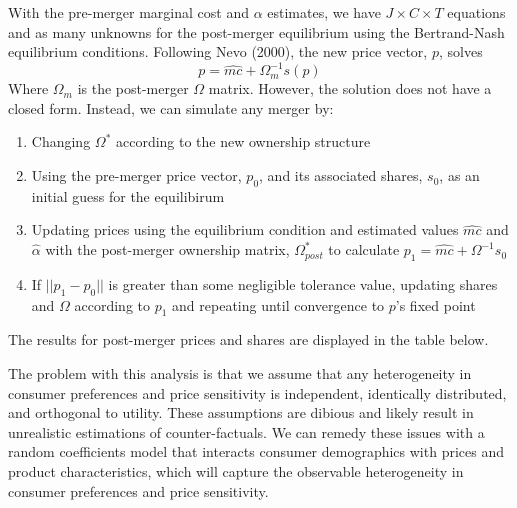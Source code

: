 \documentclass{article}
\newcommand{\ahat}{\hat{\alpha}}
\begin{document}
With the pre-merger marginal cost and $\alpha$ estimates, we have $J\times C\times T$ equations and as many unknowns for the post-merger equilibrium using the Bertrand-Nash equilibrium conditions. Following Nevo (2000), the new price vector, $p$, solves \[ 
        p = \hat{mc} + \Omega_{m}^{-1}s(p)
\]
Where $\Omega_m$ is the post-merger $\Omega$ matrix. 
However, the solution does not have a closed form. Instead, we can simulate any merger by:
\begin{enumerate}
        \item Changing $\Omega^*$ according to the new ownership structure
        \item Using the pre-merger price vector, $p_0$, and its associated shares, $s_0$, as an initial guess for the equilibirum
        \item Updating prices using the equilibrium condition and estimated values $\hat{mc}$ and $\ahat$ with the post-merger ownership matrix, $\Omega^*_{post}$ to calculate ${p_1 = \hat{mc} + \Omega^{-1}s_0}$
        \item If $||p_1-p_0||$ is greater than some negligible tolerance value, updating shares and $\Omega$ according to $p_1$ and repeating until convergence to $p$'s fixed point
\end{enumerate}
The results for post-merger prices and shares are displayed in the table below.
\begin{center}
        
\end{center}
The problem with this analysis is that we assume that any heterogeneity in consumer preferences and price sensitivity is independent, identically distributed, and orthogonal to utility. These assumptions are dibious and likely result in unrealistic estimations of counter-factuals. We can remedy these issues with a random coefficients model that interacts consumer demographics with prices and product characteristics, which will capture the observable heterogeneity in consumer preferences and price sensitivity.
\begin{center}  
        
\end{center}

\end{document}
